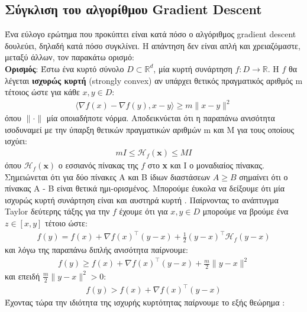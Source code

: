 \documentclass[11pt]{article} %
\numberwithin{equation}{subsection}
\begin{document}
\subsection{Σύγκλιση του αλγορίθμου Gradient Descent}
Ένα εύλογο ερώτημα που προκύπτει είναι κατά πόσο ο αλγόριθμος gradient descent δουλεύει, δηλαδή κατά πόσο συγκλίνει. Η απάντηση δεν είναι απλή και χρειαζόμαστε, μεταξύ άλλων, τον παρακάτω ορισμό:\\

\textbf{Ορισμός}: Έστω ένα κυρτό σύνολο $D \subset \mathbb{R}^d$, μία κυρτή συνάρτηση $f : D \rightarrow \mathbb{R}$. Η $f$ θα λέγεται \textbf{ισχυρώς κυρτή} (strongly convex) αν υπάρχει θετικός πραγματικός αριθμός m τέτοιος ώστε για κάθε $x,y \in D$:
\begin{align*}
\langle \nabla f(x) - \nabla f(y), x - y \rangle \geq m \parallel x - y \parallel ^ 2
\end{align*}
όπου $\parallel \cdot \parallel$ μία οποιαδήποτε νόρμα. Αποδεικνύεται \cite{graddes2} ότι η παραπάνω ανισότητα ισοδυναμεί με την ύπαρξη θετικών πραγματικών αριθμών m και M για τους οποίους ισχύει:
\begin{align*}
mI \leq \mathcal{H}_f (\textbf{x}) \leq MI
\end{align*}
όπου $\mathcal{H}_f (\textbf{x})$ ο εσσιανός πίνακας της $f$ στο \textbf{x} και I ο μοναδιαίος πίνακας. Σημειώνεται ότι για δύο πίνακες A και B ίδιων διαστάσεων $A \geq B$ σημαίνει ότι ο πίνακας Α - B είναι θετικά ημι-ορισμένος.  Μπορούμε έυκολα να δείξουμε ότι μία ισχυρώς κυρτή συνάρτηση είναι και αυστηρά κυρτή \cite{graddes2}. Παίρνοντας το ανάπτυγμα Taylor δεύτερης τάξης για την $f$ έχουμε ότι για $x,y \in D$ μπορούμε να βρούμε ένα $z \in [x, y]$ τέτοιο ώστε:
\begin{align*}
f(y) = f(x) + \nabla f(x) ^ \intercal (y - x) + \frac{1}{2} (y - x) ^ \intercal \mathcal{H}_f (y - x)
\end{align*}
και λόγω της παραπάνω διπλής ανισότητα παίρνουμε:
\begin{align*}
f(y) \geq f(x) + \nabla f(x) ^ \intercal (y - x) + \frac{m}{2} \parallel y - x \parallel ^ 2
\end{align*}
και επειδή $\frac{m}{2} \parallel y - x \parallel ^ 2 > 0$:
\begin{align*}
f(y) > f(x) + \nabla f(x) ^ \intercal (y - x)
\end{align*}
Έχοντας τώρα την ιδιότητα της ισχυρής κυρτότητας παίρνουμε το εξής θεώρημα \cite{graddes}:\\
\end{document}
